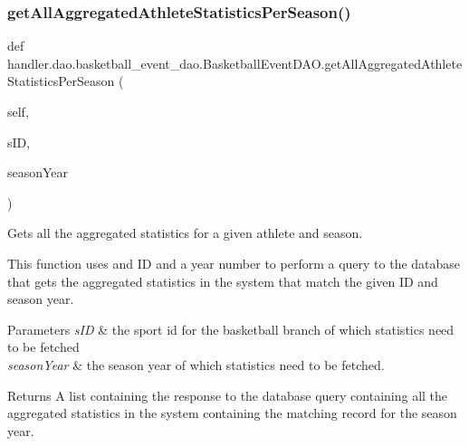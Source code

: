 \subsubsection{\texorpdfstring{get\+All\+Aggregated\+Athlete\+Statistics\+Per\+Season()}{getAllAggregatedAthleteStatisticsPerSeason()}}
{\footnotesize\ttfamily def handler.\+dao.\+basketball\+\_\+event\+\_\+dao.\+Basketball\+Event\+D\+A\+O.\+get\+All\+Aggregated\+Athlete\+Statistics\+Per\+Season (\begin{DoxyParamCaption}\item[{}]{self,  }\item[{}]{s\+ID,  }\item[{}]{season\+Year }\end{DoxyParamCaption})}



Gets all the aggregated statistics for a given athlete and season. 

This function uses and ID and a year number to perform a query to the database that gets the aggregated statistics in the system that match the given ID and season year.


\begin{DoxyParams}{Parameters}
{\em s\+ID} & the sport id for the basketball branch of which statistics need to be fetched \\
\hline
{\em season\+Year} & the season year of which statistics need to be fetched.\\
\hline
\end{DoxyParams}
\begin{DoxyReturn}{Returns}
A list containing the response to the database query containing all the aggregated statistics in the system containing the matching record for the season year. 
\end{DoxyReturn}
\mbox{\label{classhandler_1_1dao_1_1basketball__event__dao_1_1_basketball_event_d_a_o_ad880b1a4316cbfe009dc7b4628619862}} 
